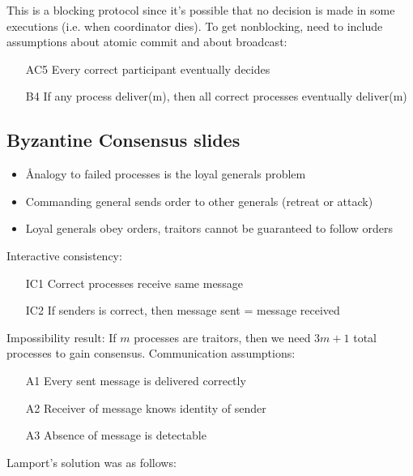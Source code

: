 \documentclass[a4paper,10pt,]{article}
\begin{document}
This is a blocking protocol since it's possible that no decision is made in some executions (i.e. when coordinator dies).  To get nonblocking, need to include assumptions about atomic commit and about broadcast:
\begin{itemize}
  \item[AC5] Every correct participant eventually decides
  \item[B4] If any process deliver(m), then all correct processes eventually deliver(m)
\end{itemize}

\subsection{Byzantine Consensus slides}
\begin{itemize}
  \item Ånalogy to failed processes is the loyal generals problem
  \item Commanding general sends order to other generals (retreat or attack)
  \item Loyal generals obey orders, traitors cannot be guaranteed to follow orders
\end{itemize}
Interactive consistency:
\begin{itemize}
  \item[IC1] Correct processes receive same message
  \item[IC2] If senders is correct, then message sent = message received
\end{itemize}
Impossibility result: If $m$ processes are traitors, then we need $3m+1$ total processes to gain consensus.
Communication assumptions:
\begin{itemize}
  \item[A1] Every sent message is delivered correctly
  \item[A2] Receiver of message knows identity of sender
  \item[A3] Absence of message is detectable
\end{itemize}
Lamport's solution was as follows:
\end{document}
